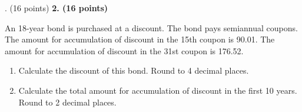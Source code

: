 \documentclass[12pt]{article}
\makeatletter
\newenvironment{problem}[1][]{%
  \bigskip%
  \noindent\begin{boxedminipage}{\columnwidth}%
  \def\@tempa{#1}%
  \ifx\@tempa\empty\else%
    \textbf{#1}\hspace{0.5em}%
  \fi%
}{%
  \end{boxedminipage}%
}
\makeatother
\begin{document}


\newpage



\begin{problem}[2. (16 points)]
An 18-year bond is purchased at a discount. The bond pays semiannual coupons.
The amount for accumulation of discount in the 15th coupon is 90.01. The amount for 
accumulation of discount in the 31st coupon is 176.52.

\begin{enumerate}
    \item[(a)] Calculate the discount of this bond. Round to 4 decimal places.
    \item[(b)] Calculate the total amount for accumulation of discount in the first 10 years. Round to 2 decimal places.
\end{enumerate}
\end{problem}






\newpage
\end{document}
